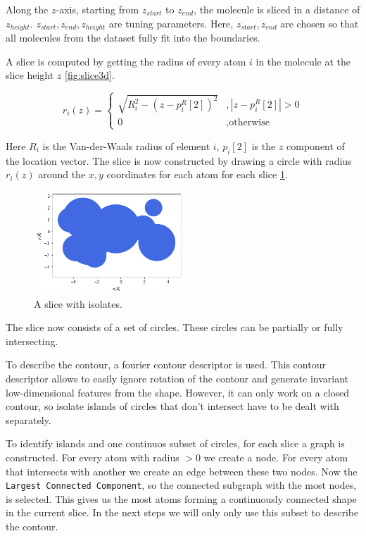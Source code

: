 Along the $z$-axis, starting from $z_{start}$ to $z_{end}$, the molecule is sliced in a distance of $z_{height}$.
$z_{start}, z_{end}, z_{height}$ are tuning parameters.
Here, $z_{start}, z_{end}$ are chosen so that all molecules from the dataset fully fit into the boundaries.

A slice is computed by getting the radius of every atom $i$ in the molecule at the slice height $z$ \ref{fig:slice3d}.

$$ r_i(z) =\left\{\begin{array}{ll} \sqrt{R_i^2 - (z - p_i^R[2])^2} &, | z - p_i^R[2] |  > 0\\
  0 &, \text{otherwise}\end{array}\right.
$$

Here $R_i$ is the Van-der-Waals radius of element $i$, $p_i[2]$ is the $z$ component of the location vector.
The slice is now constructed by drawing a circle with radius $r_i(z)$ around the $x,y$ coordinates for each atom for each slice \ref{fig:slice}.

\begin{figure} [h]
  \centering
  \includegraphics[width=0.5\textwidth]{figures/fourier/slice-iso.png} %
  \caption{A slice with isolates.}
  \label{fig:slice}
\end{figure}

The slice now consists of a set of circles.
These circles can be partially or fully intersecting. 

To describe the contour, a fourier contour descriptor is used.
This contour descriptor allows to easily ignore rotation of the contour and generate invariant low-dimensional features from the shape.
However, it can only work on a closed contour, so isolate islands of circles that don't intersect have to be dealt with separately.

To identify islands and one continuos subset of circles, for each slice a graph is constructed.
For every atom with radius $>0$ we create a node.
For every atom that intersects with another we create an edge between these two nodes.
Now the \texttt{Largest Connected Component}, so the connected subgraph with the most nodes, is selected.
This gives us the most atoms forming a continuously connected shape in the current slice.
In the next steps we will only only use this subset to describe the contour.


